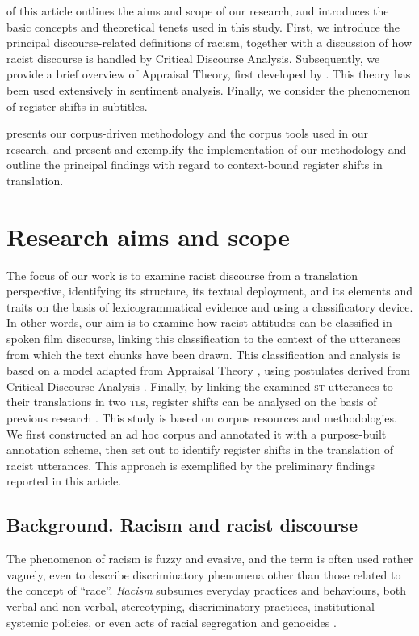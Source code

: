 \documentclass[output=paper]{LSP/langsci}
\begin{document}
 of this article outlines the aims and scope of our research, and introduces the basic concepts and theoretical tenets used in this study. First, we introduce the principal discourse-related definitions of racism, together with a discussion of how racist discourse is handled by Critical Discourse Analysis. Subsequently, we provide a brief overview of Appraisal Theory, first developed by \citet{MartinWhite2005}. This theory has been used extensively in sentiment analysis. Finally, we consider the phenomenon of register shifts in subtitles.

 presents our corpus-driven methodology and the corpus tools used in our research.  and  present and exemplify the implementation of our methodology and outline the principal findings with regard to context-bound register shifts in translation.

\section{Research aims and scope} \label{sec:2:2}
The focus of our work is to examine racist discourse from a translation perspective, identifying its structure, its textual deployment, and its elements and traits on the basis of lexicogrammatical evidence and using a classificatory device. In other words, our aim is to examine how racist attitudes can be classified in spoken film discourse, linking this classification to the context of the utterances from which the text chunks have been drawn. This classification and analysis is based on a model adapted from Appraisal Theory \citep{MartinWhite2005}, using postulates derived from Critical Discourse Analysis \citep{Reisigl2001,Dijk2000a,Dijk2000b,Dijk2002}. Finally, by linking the examined \textsc{st} utterances to their translations in two \textsc{tl}s, register shifts can be analysed on the basis of previous research \citep{Hatim1997, Mason2001, Pettit2005, Mubenga2009, Munday2012}.
This study is based on corpus resources and methodologies. We first constructed an ad hoc corpus and annotated it with a purpose-built annotation scheme, then set out to identify register shifts in the translation of racist utterances. This approach is exemplified by the preliminary findings reported in this article.

\subsection{Background. Racism and racist discourse} \label{sec:2:2:1}
The phenomenon of racism is fuzzy and evasive, and the term is often used rather vaguely, even to describe discriminatory phenomena other than those related to the concept of “race”. \textit{Racism} subsumes everyday practices and behaviours, both verbal and non-verbal, stereotyping, discriminatory practices, institutional systemic policies, or even acts of racial segregation and genocides \citep[637--653]{Giddens2009}.
\end{document}
